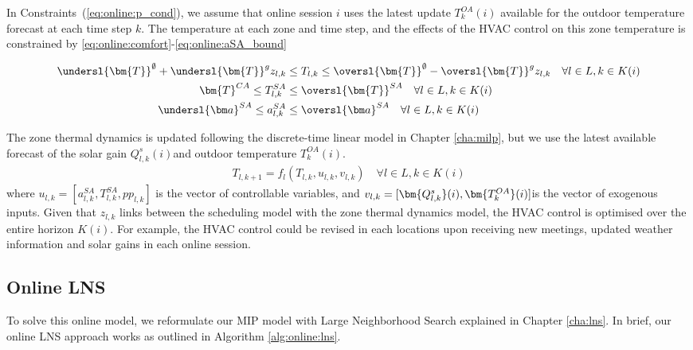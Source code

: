 In Constraints~(\ref{eq:online:p_cond}), we assume that online session $i$ uses the latest update $T_{k}^{OA}(i)$ available for the outdoor temperature forecast at each time step $k$. 
The temperature at each zone and time step, and the effects of the HVAC control on this zone temperature is constrained by \eqref{eq:online:comfort}-\eqref{eq:online:aSA_bound}

\begin{align}
\undersl{\bm{T}}^{\emptyset} + \undersl{\bm{T}}^gz_{l,k} &\leq T_{l,k} \leq \oversl{\bm{T}}^{\emptyset} - \oversl{\bm{T}}^gz_{l,k} \quad \forall l\in L , k \in K(i) \label{eq:online:comfort} \\
\bm{T}^{CA} \leq T^{SA}_{l,k} &\leq \oversl{\bm{T}}^{SA} \quad \forall l \in L, k \in K(i) \label{eq:online:TSA_bound} \\
\undersl{\bm a}^{SA} \leq a^{SA}_{l,k} &\leq \oversl{\bm a}^{SA} \quad \forall l \in L, k \in K(i) \label{eq:online:aSA_bound}
\end{align}

The zone thermal dynamics is updated following the discrete-time linear model in Chapter \ref{cha:milp}, but we use the latest available forecast of the solar gain $Q^s_{l,k}(i)$and outdoor temperature $T_{k}^{OA}(i)$. 
\begin{align}
T_{l,k+1} = f_{l}(T_{l,k}, u_{l,k}, v_{l,k}) \quad \forall l \in L, k \in K(i) 
\end{align}  
where $u_{l,k} = [a^{SA}_{l,k}, T^{SA}_{l,k},pp_{l,k}]$ is the vector of controllable variables, and $v_{l,k} = [\bm{Q^s_{l,k}}(i), \\\bm{T^{OA}_k}(i)]$is the vector of exogenous inputs. Given that $z_{l,k}$ links between the scheduling model with the zone thermal dynamics model, the HVAC control is optimised over the entire horizon $K(i)$. For example, the HVAC control could be revised in each locations upon receiving new meetings, updated weather information and solar gains in each online session.


\subsection{Online LNS}

To solve this online model, we reformulate our MIP model with Large Neighborhood Search explained in Chapter \ref{cha:lns}. In brief, our online LNS approach works as outlined in Algorithm \ref{alg:online:lns}.

